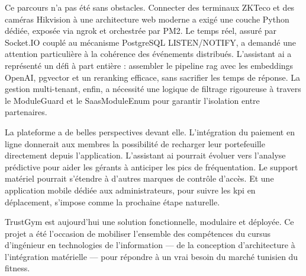 \documentclass[../main.tex]{subfiles}
\begin{document}
Ce parcours n'a pas \'{e}t\'{e} sans obstacles. Connecter des terminaux ZKTeco et des cam\'{e}ras Hikvision \`{a} une architecture web moderne a exig\'{e} une couche Python d\'{e}di\'{e}e, expos\'{e}e via ngrok et orchestr\'{e}e par PM2. Le temps r\'{e}el, assur\'{e} par Socket.IO coupl\'{e} au m\'{e}canisme PostgreSQL LISTEN/NOTIFY, a demand\'{e} une attention particuli\`{e}re \`{a} la coh\'{e}rence des \'{e}v\'{e}nements distribu\'{e}s. L'assistant \acrshort{ai} a repr\'{e}sent\'{e} un d\'{e}fi \`{a} part enti\`{e}re : assembler le pipeline \acrshort{rag} avec les embeddings OpenAI, pgvector et un reranking efficace, sans sacrifier les temps de r\'{e}ponse. La gestion multi-tenant, enfin, a n\'{e}cessit\'{e} une logique de filtrage rigoureuse \`{a} travers le ModuleGuard et le SaasModuleEnum pour garantir l'isolation entre partenaires.

La plateforme a de belles perspectives devant elle. L'int\'{e}gration du paiement en ligne donnerait aux membres la possibilit\'{e} de recharger leur portefeuille directement depuis l'application. L'assistant \acrshort{ai} pourrait \'{e}voluer vers l'analyse pr\'{e}dictive pour aider les g\'{e}rants \`{a} anticiper les pics de fr\'{e}quentation. Le support mat\'{e}riel pourrait s'\'{e}tendre \`{a} d'autres marques de contr\^{o}le d'acc\`{e}s. Et une application mobile d\'{e}di\'{e}e aux administrateurs, pour suivre les \acrshort{kpi} en d\'{e}placement, s'impose comme la prochaine \'{e}tape naturelle.

TrustGym est aujourd'hui une solution fonctionnelle, modulaire et d\'{e}ploy\'{e}e. Ce projet a \'{e}t\'{e} l'occasion de mobiliser l'ensemble des comp\'{e}tences du cursus d'ing\'{e}nieur en technologies de l'information --- de la conception d'architecture \`{a} l'int\'{e}gration mat\'{e}rielle --- pour r\'{e}pondre \`{a} un vrai besoin du march\'{e} tunisien du fitness.
\end{document}
